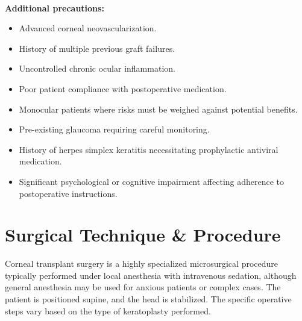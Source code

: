 \paragraph{}
\textbf{Additional precautions:}
\begin{itemize}
  \item Advanced corneal neovascularization.
  \item History of multiple previous graft failures.
  \item Uncontrolled chronic ocular inflammation.
  \item Poor patient compliance with postoperative medication.
  \item Monocular patients where risks must be weighed against potential benefits.
  \item Pre-existing glaucoma requiring careful monitoring.
  \item History of herpes simplex keratitis necessitating prophylactic antiviral medication.
  \item Significant psychological or cognitive impairment affecting adherence to postoperative instructions.
\end{itemize}

\section*{Surgical Technique \& Procedure}
Corneal transplant surgery is a highly specialized microsurgical procedure typically performed under local anesthesia with intravenous sedation, although general anesthesia may be used for anxious patients or complex cases. The patient is positioned supine, and the head is stabilized. The specific operative steps vary based on the type of keratoplasty performed.

